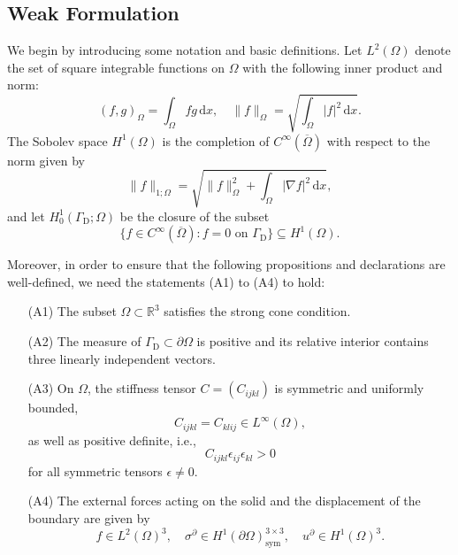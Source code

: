 \documentclass[a4paper, 11pt, twoside]{article}
\theoremstyle{plain}
\theoremstyle{definition}
\providecommand{\abs}[1]{\lvert#1\rvert}
\providecommand{\norm}[1]{\lVert#1\rVert}
\newcommand{\dd}{\,\mathrm{d}}
\newcommand{\R}{\mathbb{R}}
\begin{document}
\subsection{Weak Formulation}

We begin by introducing some notation and basic definitions.
Let $L^2(\Omega)$ denote the set of square integrable functions on $\Omega$ with the following inner product and norm:
\begin{equation}
	(f,g)_\Omega = \int_\Omega f g \dd x , \quad
	\norm{f}_\Omega = \sqrt{ \int_\Omega \abs{f}^2 \dd x }.
\end{equation}
The Sobolev space $H^1(\Omega)$ is the completion of $C^\infty(\overline{\Omega})$ with respect to the norm given by
\begin{equation}
	\norm{f}_{1;\Omega} = \sqrt{ \norm{f}_\Omega^2 + \int_\Omega \abs{\nabla f}^2 \dd x },
\end{equation}
and let $H^1_0(\Gamma_\text{D};\Omega)$ be the closure of the subset
\begin{equation}
	\{ f \in C^\infty(\overline{\Omega}) : f = 0  \text{ on } \Gamma_{\text{D}} \} \subseteq H^1(\Omega).
\end{equation}

Moreover, in order to ensure that the following propositions and declarations are well-defined, we need the statements (A1) to (A4) to hold:
\begin{itemize}
	\item[(A1)] The subset $\Omega \subset \R^3$ satisfies the strong cone condition.
	\item[(A2)] The measure of $\Gamma_{\text{D}} \subset \partial\Omega$ is positive and its relative interior contains three linearly independent vectors.
	\item[(A3)] On $\Omega$, the stiffness tensor $C = (C_{ijkl})$ is symmetric and uniformly bounded,
	\begin{equation}
		C_{ijkl} = C_{klij} \in L^{\infty}(\Omega),
	\end{equation}
	as well as positive definite, i.e.,
	\begin{equation}
		C_{ijkl}\epsilon_{ij}\epsilon_{kl} > 0
	\end{equation}
	for all symmetric tensors $\epsilon \neq 0$.
	\item[(A4)] The external forces acting on the solid and the displacement of the boundary are given by 
	\begin{equation}
		f \in L^2(\Omega)^3, \quad \sigma^\partial \in H^1(\partial\Omega)^{3 \times 3}_{\text{sym}}, \quad u^\partial \in H^1(\Omega)^3.
	\end{equation}
\end{itemize}
\end{document}
